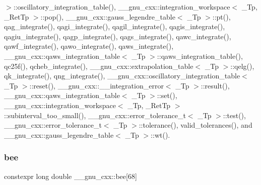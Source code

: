 $>$\+::oscillatory\+\_\+integration\+\_\+table(), \+\_\+\+\_\+gnu\+\_\+cxx\+::integration\+\_\+workspace$<$ \+\_\+\+Tp, \+\_\+\+Ret\+Tp $>$\+::pop(), \+\_\+\+\_\+gnu\+\_\+cxx\+::gauss\+\_\+legendre\+\_\+table$<$ \+\_\+\+Tp $>$\+::pt(), qag\+\_\+integrate(), qagi\+\_\+integrate(), qagil\+\_\+integrate(), qagis\+\_\+integrate(), qagiu\+\_\+integrate(), qagp\+\_\+integrate(), qags\+\_\+integrate(), qawc\+\_\+integrate(), qawf\+\_\+integrate(), qawo\+\_\+integrate(), qaws\+\_\+integrate(), \+\_\+\+\_\+gnu\+\_\+cxx\+::qaws\+\_\+integration\+\_\+table$<$ \+\_\+\+Tp $>$\+::qaws\+\_\+integration\+\_\+table(), qc25f(), qcheb\+\_\+integrate(), \+\_\+\+\_\+gnu\+\_\+cxx\+::extrapolation\+\_\+table$<$ \+\_\+\+Tp $>$\+::qelg(), qk\+\_\+integrate(), qng\+\_\+integrate(), \+\_\+\+\_\+gnu\+\_\+cxx\+::oscillatory\+\_\+integration\+\_\+table$<$ \+\_\+\+Tp $>$\+::reset(), \+\_\+\+\_\+gnu\+\_\+cxx\+::\+\_\+\+\_\+integration\+\_\+error$<$ \+\_\+\+Tp $>$\+::result(), \+\_\+\+\_\+gnu\+\_\+cxx\+::qaws\+\_\+integration\+\_\+table$<$ \+\_\+\+Tp $>$\+::set(), \+\_\+\+\_\+gnu\+\_\+cxx\+::integration\+\_\+workspace$<$ \+\_\+\+Tp, \+\_\+\+Ret\+Tp $>$\+::subinterval\+\_\+too\+\_\+small(), \+\_\+\+\_\+gnu\+\_\+cxx\+::error\+\_\+tolerance\+\_\+t$<$ \+\_\+\+Tp $>$\+::test(), \+\_\+\+\_\+gnu\+\_\+cxx\+::error\+\_\+tolerance\+\_\+t$<$ \+\_\+\+Tp $>$\+::tolerance(), valid\+\_\+tolerances(), and \+\_\+\+\_\+gnu\+\_\+cxx\+::gauss\+\_\+legendre\+\_\+table$<$ \+\_\+\+Tp $>$\+::wt().

\mbox{\label{namespace____gnu__cxx_aad4f17907300687377704d1e628e1d70}} 
\subsubsection{\texorpdfstring{bee}{bee}}
{\footnotesize\ttfamily constexpr long double \+\_\+\+\_\+gnu\+\_\+cxx\+::bee\mbox{[}68\mbox{]}}

